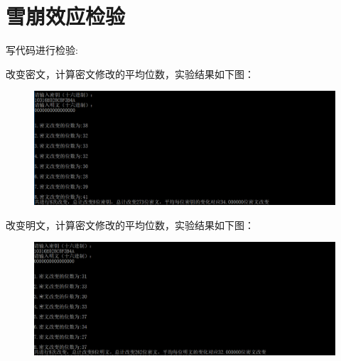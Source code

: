 \documentclass[UTF8,a4paper]{article}
\begin{document}
	\section{雪崩效应检验}
写代码进行检验:\par
改变密文，计算密文修改的平均位数，实验结果如下图：\par 
		\begin{figure}[!ht]
	
	\centering
	\includegraphics[width=1.0\textwidth]{miyao.PNG}
	\label{fig:miyao}
\end{figure}
\newpage
改变明文，计算密文修改的平均位数，实验结果如下图：\par 
		\begin{figure}[!ht]
	
	\centering
	\includegraphics[width=1.0\textwidth]{mingwen.PNG}
	\label{fig:mingwen}
\end{figure}
\end{document}
